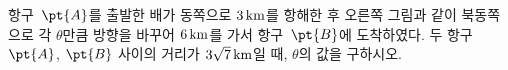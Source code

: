 \noindent\begin{minipage}[t]{0.58\linewidth}\vspace{0pt}\raggedright 항구~$\pt{A}$를 출발한 배가 동쪽으로 $3\mkern3mu \mathrm{km}$를 항해한 후 오른쪽 그림과 같이 북동쪽으로 각 $\theta$만큼 방향을 바꾸어 $6\mkern3mu \mathrm{km}$를 가서 항구~$\pt{B}$에 도착하였다. 두 항구~$\pt{A}$, $\pt{B}$ 사이의 거리가 $3\sqrt{7}\mkern3mu \mathrm{km}$일 때, $\theta$의 값을 구하시오.\end{minipage}\hfill\begin{minipage}[t]{0.4\linewidth}\vspace{0pt}\centering \resizebox{\ifdim\width>\linewidth\linewidth\else\width\fi}{!}{}\end{minipage}\par
